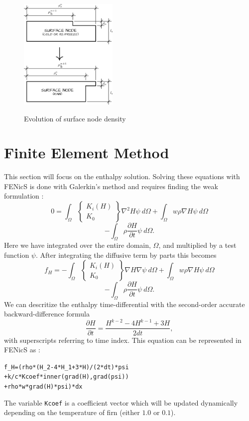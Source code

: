 \documentclass{article}%
\begin{document}
\begin{figure}[H]
	\centering
		\includegraphics[width=0.42\textwidth]{images/surfaceDensity.png}
	\label{fig:500 year orbit}
	\caption{Evolution of surface node density}
\end{figure}

\section{Finite Element Method}

This section will focus on the enthalpy solution.  Solving these equations with FENicS is done with Galerkin's method and requires finding the weak formulation :
  $$
    0 =
    \int_{\Omega} 
      \begin{Bmatrix}
        K_i(H)\\
        K_0
      \end{Bmatrix}
      \nabla^2 H \psi\ d \Omega 
    + \int_{\Omega}w \rho \nabla H \psi\ d \Omega
  $$
  $$
    - \int_{\Omega} {\rho \frac{\partial H}{\partial t}} \psi\ d \Omega.
  $$
Here we have integrated over the entire domain, $\Omega$, and multiplied by a test function $\psi$.  After integrating the diffusive term by parts this becomes
  $$
    f_H =
    - \int_{\Omega} 
        \begin{Bmatrix}
          K_i(H)\\
          K_0
        \end{Bmatrix}
        \nabla H \nabla \psi\ d \Omega 
    + \int_{\Omega}w \rho \nabla H \psi\ d \Omega
  $$
  $$
    - \int_{\Omega} {\rho \frac{\partial H}{\partial t}} \psi\ d \Omega.
  $$
We can descritize the enthalpy time-differential with the second-order accurate backward-difference formula
  $$\frac{\partial H}{\partial t} = \frac{H^{k-2} - 4H^{k-1} + 3H}{2dt},$$
with superscripts referring to time index.  This equation can be represented in FENicS as :\par
\footnotesize
\begin{alltt}
f_H = (rho*(H_2 - 4*H_1 + 3*H)/(2*dt)*psi 
      + k/c*Kcoef*inner(grad(H), grad(psi))
      + rho*w*grad(H)*psi)*dx
\end{alltt}
\normalsize
The variable \texttt{Kcoef} is a coefficient vector which will be updated dynamically depending on the temperature of firn (either $1.0$ or $0.1$).
\end{document}
